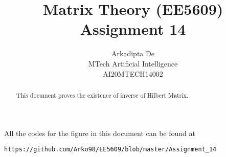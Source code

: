 \documentclass[journal,12pt,twocolumn]{IEEEtran}
\DeclareMathOperator*{\Res}{Res}
\begin{document}
\providecommand{\abs}[1]{\left\vert#1\right\vert}
\providecommand{\res}[1]{\Res\displaylimits_{#1}} 
\providecommand{\norm}[1]{\left\lVert#1\right\rVert}
\providecommand{\mtx}[1]{\mathbf{#1}}
\providecommand{\mean}[1]{E\left[ #1 \right]}
\providecommand{\fourier}{\overset{\mathcal{F}}{ \rightleftharpoons}}
\providecommand{\system}{\overset{\mathcal{H}}{ \longleftrightarrow}}
\newcommand{\solution}{\noindent \textbf{Solution: }}
\newcommand{\cosec}{\,\text{cosec}\,}
\providecommand{\dec}[2]{\ensuremath{\overset{#1}{\underset{#2}{\gtrless}}}}
\newcommand{\myvec}[1]{\ensuremath{\begin{pmatrix}#1\end{pmatrix}}}
\newcommand{\mydet}[1]{\ensuremath{\begin{vmatrix}#1\end{vmatrix}}}
\makeatletter
{}
\makeatother
\let\StandardTheFigure\thefigure
\let\vec\mathbf
\renewcommand{\thefigure}{\theproblem}
\def\putbox#1#2#3{\makebox[0in][l]{\makebox[#1][l]{}\raisebox{\baselineskip}[0in][0in]{\raisebox{#2}[0in][0in]{#3}}}}
     \def\rightbox#1{\makebox[0in][r]{#1}}
     \def\centbox#1{\makebox[0in]{#1}}
     \def\topbox#1{\raisebox{-\baselineskip}[0in][0in]{#1}}
     \def\midbox#1{\raisebox{-0.5\baselineskip}[0in][0in]{#1}}
\vspace{3cm}
\title{Matrix Theory (EE5609) Assignment 14}
\author{Arkadipta De\\MTech Artificial Intelligence\\AI20MTECH14002}

\maketitle
\newpage
\bigskip
\renewcommand{\thefigure}{\theenumi}
\renewcommand{\thetable}{\theenumi}

\begin{abstract}
This document proves the existence of inverse of Hilbert Matrix.  
\end{abstract}
All the codes for the figure in this document can be found at
\begin{lstlisting}
https://github.com/Arko98/EE5609/blob/master/Assignment_14
\end{lstlisting}
\end{document}
